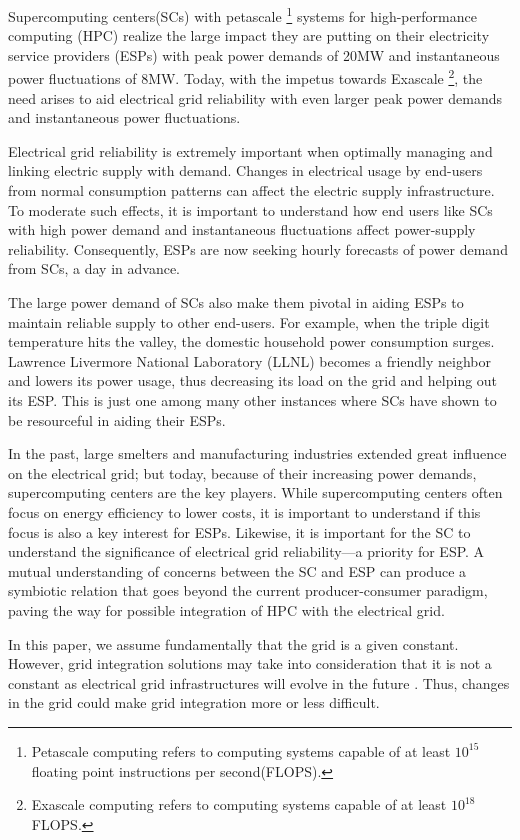 Supercomputing centers(SCs) with petascale
\footnote{Petascale computing refers to computing systems capable of at
least \(10^{15}\) floating point instructions per second(FLOPS).} 
systems for high-performance computing (HPC) realize the large 
impact they are putting on their electricity service providers (ESPs) with peak 
power demands of 20MW and instantaneous power fluctuations of 8MW. 
Today, with the impetus towards Exascale
\footnote{Exascale computing refers to computing systems capable of at
least \(10^{18}\)FLOPS.}, 
the need arises to
aid electrical grid reliability  with even larger peak power demands and 
instantaneous power fluctuations.

Electrical grid reliability is extremely important when optimally managing and 
linking electric supply with demand. Changes in electrical usage by end-users from normal 
consumption patterns can affect the electric supply infrastructure. 
To moderate such effects, it is important to understand how end users like SCs with 
high power demand and instantaneous fluctuations
affect power-supply reliability. 
Consequently, ESPs are now seeking hourly forecasts of power demand from SCs, a day in advance.

The large power demand of SCs also make them pivotal in  
aiding ESPs to maintain reliable supply to other end-users. 
For example, when the triple digit temperature hits the valley,
the domestic household power consumption surges. 
Lawrence Livermore National Laboratory (LLNL) becomes a friendly neighbor and 
lowers its power usage, thus decreasing its load on the grid and helping out its ESP.
This is just one among many other instances where SCs have shown to be  
resourceful in aiding their ESPs.

In the past, large smelters and manufacturing industries extended 
great influence on the electrical grid; but today, because of their increasing power demands,
supercomputing centers are the key players.
While supercomputing centers often focus on energy efficiency to lower costs, 
it is important to understand if this focus is also a key interest for ESPs.
Likewise, it is important for the SC to understand the significance of electrical grid 
reliability---a priority for ESP. 
A mutual understanding of concerns between the SC and ESP can 
produce a symbiotic relation that goes beyond the current producer-consumer 
paradigm, paving the way for possible integration of HPC with the electrical grid.

In this paper, we assume fundamentally that the grid is a given constant. However, grid integration solutions may take into consideration that it is not a constant as electrical grid infrastructures will evolve in the future \cite{he_architecture_2008}. Thus, changes in the grid could make grid integration more or less difficult.

